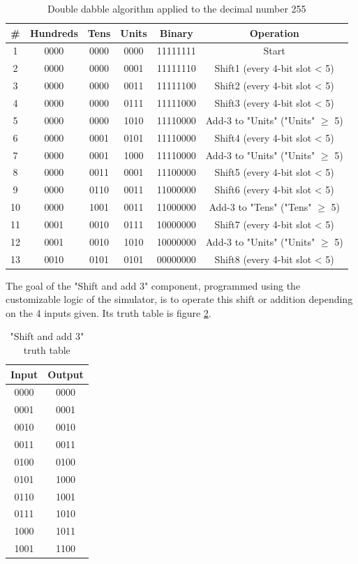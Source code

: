 \documentclass{article}
\begin{document}
\begin{table}[h]
  \centering
  \begin{tabular}{||c|c|c|c||c||c||}
    \hline
    \# & Hundreds & Tens & Units & Binary & Operation \\
    \hline
    1 & 0000 & 0000 & 0000 & 11111111 & Start \\
    2 & 0000 & 0000 & 0001 & 11111110 & Shift1 (every 4-bit slot < 5) \\
    3 & 0000 & 0000 & 0011 & 11111100 & Shift2 (every 4-bit slot < 5) \\ 
    4 & 0000 & 0000 & 0111 & 11111000 & Shift3 (every 4-bit slot < 5) \\
    5 & 0000 & 0000 & 1010 & 11110000 & Add-3 to "Units" ("Units" $\geq$ 5)\\
    6 & 0000 & 0001 & 0101 & 11110000 & Shift4 (every 4-bit slot < 5) \\
    7 & 0000 & 0001 & 1000 & 11110000 & Add-3 to "Units" ("Units" $\geq$ 5)\\
    8 & 0000 & 0011 & 0001 & 11100000 & Shift5 (every 4-bit slot < 5) \\
    9 & 0000 & 0110 & 0011 & 11000000 & Shift6 (every 4-bit slot < 5) \\
    10 & 0000 & 1001 & 0011& 11000000 & Add-3 to "Tens" ("Tens" $\geq$ 5)\\
    11 & 0001 & 0010 & 0111& 10000000 & Shift7 (every 4-bit slot < 5) \\
    12 & 0001 & 0010 & 1010& 10000000 & Add-3 to "Units" ("Units" $\geq$ 5)\\
    13 & 0010 & 0101 & 0101& 00000000 & Shift8 (every 4-bit slot < 5) \\
    \hline
  \end{tabular}
    \label{SC_Algo}
    \caption{Double dabble algorithm applied to the decimal number 255}

  \end{table}


The goal of the "Shift and add 3" component, programmed using the customizable logic of the simulator, is to operate this shift or addition depending on the 4 inputs given. Its truth table is figure \ref{Add3Table}.

\begin{table}[h]
  \centering
  \begin{tabular}{||c|c||}
    \hline
    Input & Output \\
    \hline
    0000 & 0000 \\
    0001 & 0001 \\
    0010 & 0010 \\ 
    0011 & 0011 \\
    0100 & 0100 \\
    0101 & 1000 \\
    0110 & 1001 \\
    0111 & 1010 \\
    1000 & 1011 \\
    1001 & 1100 \\
    \hline
  \end{tabular}
    \label{Add3Table}
    \caption{"Shift and add 3" truth table}
  \end{table}
\end{document}
